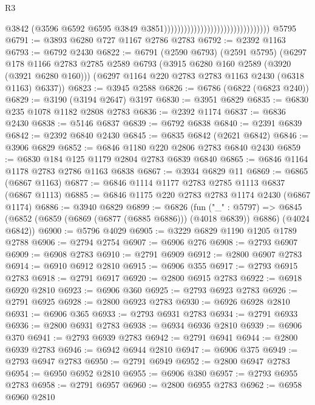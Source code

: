 \begin{lexlean}{R3}
\begin{coremodule}
                                                                  @3842
                                                                  (@3596
                                                                    @6592
                                                                    @6595
                                                                    @3849
                                                                    @3851))))))))))))))))))))))))))))))))
    @5795
@6791 := @3893 @6280 @727 @1167 @2786 @2783
@6792 := @2392 @1163
@6793 := @6792 @2430
@6822 := @6791
    (@2590 @6793)
    (@2591 @5795)
    (@6297
      @178
      @1166
      @2783
      @2785
      @2589
      @6793
      (@3915 @6280 @160 @2589 (@3920 (@3921 @6280 @160)))
      (@6297 @1164 @220 @2783 @2783 @1163 @2430 (@6318 @1163) @6337))
@6823 := @3945 @2588
@6826 := @6786 (@6822 (@6823 @240))
@6829 := @3190 (@3194 @2647) @3197
@6830 := @3951 @6829
@6835 := @6830 @235 @1078 @1182 @2808 @2783
@6836 := @2392 @1174
@6837 := @6836 @2430
@6838 := @5146 @6837
@6839 := @6792 @6838
@6840 := @2391 @6839
@6842 := @2392 @6840 @2430
@6845 := @6835 @6842 (@2621 @6842)
@6846 := @3906 @6829
@6852 := @6846 @1180 @220 @2806 @2783 @6840 @2430
@6859 := @6830 @184 @125 @1179 @2804 @2783 @6839 @6840
@6865 := @6846 @1164 @1178 @2783 @2786 @1163 @6838
@6867 := @3934 @6829 @11
@6869 := @6865 (@6867 @1163)
@6877 := @6846 @1114 @1177 @2783 @2785 @1113 @6837 (@6867 @1113)
@6885 := @6846 @1175 @220 @2783 @2783 @1174 @2430 (@6867 @1174)
@6886 := @3940 @6829
@6899 := @6826
    (fun ("_" : @5797) =>
    @6845 (@6852 (@6859 (@6869 (@6877 (@6885 @6886))) (@4018 @6839)) @6886) (@4024 @6842))
@6900 := @5796 @4029
@6905 := @3229 @6829 @1190 @1205 @1789 @2788
@6906 := @2794 @2754
@6907 := @6906 @276
@6908 := @2793 @6907
@6909 := @6908 @2783
@6910 := @2791 @6909
@6912 := @2800 @6907 @2783
@6914 := @6910 @6912 @2810
@6915 := @6906 @355
@6917 := @2793 @6915 @2783
@6918 := @2791 @6917
@6920 := @2800 @6915 @2783
@6922 := @6918 @6920 @2810
@6923 := @6906 @360
@6925 := @2793 @6923 @2783
@6926 := @2791 @6925
@6928 := @2800 @6923 @2783
@6930 := @6926 @6928 @2810
@6931 := @6906 @365
@6933 := @2793 @6931 @2783
@6934 := @2791 @6933
@6936 := @2800 @6931 @2783
@6938 := @6934 @6936 @2810
@6939 := @6906 @370
@6941 := @2793 @6939 @2783
@6942 := @2791 @6941
@6944 := @2800 @6939 @2783
@6946 := @6942 @6944 @2810
@6947 := @6906 @375
@6949 := @2793 @6947 @2783
@6950 := @2791 @6949
@6952 := @2800 @6947 @2783
@6954 := @6950 @6952 @2810
@6955 := @6906 @380
@6957 := @2793 @6955 @2783
@6958 := @2791 @6957
@6960 := @2800 @6955 @2783
@6962 := @6958 @6960 @2810

\end{coremodule}
\end{lexlean}
